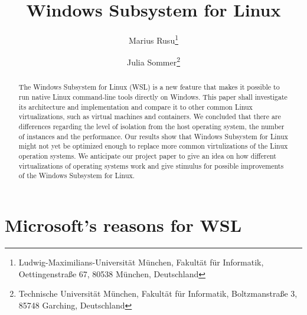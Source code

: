 \documentclass[utf8,biblatex, ngerman, english]{lni}
\begin{document}
\title[WSL]{Windows Subsystem for Linux}
\author[Marius Rusu \and Julia Sommer]
{Marius Rusu\footnote{Ludwig-Maximilians-Universität München, Fakultät für Informatik, Oettingenstraße 67, 80538 München, Deutschland } \and
 Julia Sommer\footnote{Technische Universität München, Fakultät für Informatik, Boltzmanstraße 3, 85748 Garching, Deutschland }}
\maketitle
\newpage
\tableofcontents
\newpage

\begin{abstract}
The Windows Subsystem for Linux (WSL) is a new feature that makes it possible to run native Linux command-line tools directly on Windows. This paper shall investigate its architecture and implementation and compare it to other common Linux virtualizations, such as virtual machines and containers. We concluded that there are differences regarding the level of isolation from the host operating system, the number of instances and the performance. Our results show that Windows Subsystem for Linux might not yet be optimized enough to replace more common virtulizations of the Linux operation systems. We anticipate our project paper to give an idea on how different virtualizations of operating systems work and give stimulus for possible improvements of the Windows Subsystem for Linux. 
\end{abstract}


\section{Microsoft's reasons for WSL}
\end{document}
